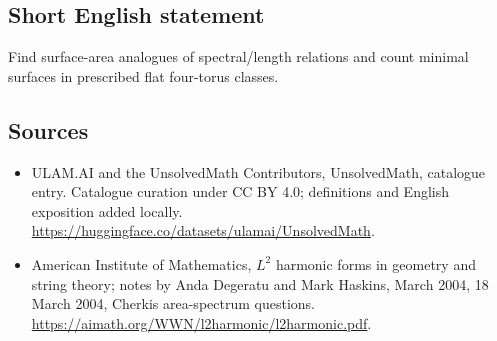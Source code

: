 \documentclass[11pt]{article}
\begin{document}
\subsection{Short English statement}
Find surface-area analogues of spectral/length relations and count minimal surfaces in prescribed flat four-torus classes.
\subsection{Sources}
\begin{itemize}
\item[\hypertarget{source:statement:1}{S1}] ULAM.AI and the UnsolvedMath Contributors, UnsolvedMath, catalogue entry. Catalogue curation under CC BY 4.0; definitions and English exposition added locally.
\url{https://huggingface.co/datasets/ulamai/UnsolvedMath}.
\item[\hypertarget{source:statement:2}{S2}] American Institute of Mathematics, $L^2$ harmonic forms in geometry and string theory; notes by Anda Degeratu and Mark Haskins, March 2004, 18 March 2004, Cherkis area-spectrum questions.
\url{https://aimath.org/WWN/l2harmonic/l2harmonic.pdf}.
\end{itemize}
\label{end:statement}
\end{document}
